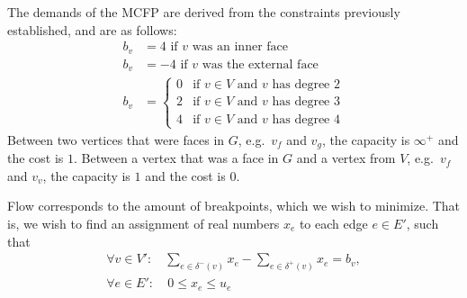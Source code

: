 The demands of the MCFP are derived from the constraints previously established,
and are as follows:
%
\begin{align*}
  b_v &= 4 \text{ if $v$ was an inner face} \\
  b_v &= -4 \text{ if $v$ was the external face} \\
  b_v &= \begin{cases}
        0 & \text{if $v \in V$ and $v$ has degree 2}\\
        2 & \text{if $v \in V$ and $v$  has degree 3}\\
        4 & \text{if $v \in V$ and $v$  has degree 4}
      \end{cases}
\end{align*}
%
Between two vertices that were faces in $G$, e.g.\ $v_f$ and $v_g$, the
capacity is $\infty^+$ and the cost is $1$. Between a vertex that was a face
in $G$ and a vertex from $V$, e.g.\ $v_f$ and $v_v$, the capacity is $1$ and
the cost is $0$.

Flow corresponds to the amount of breakpoints, which we wish to minimize. That
is, we wish to find an assignment of real numbers $x_e$ to each edge $e \in E'$,
such that
%
\begin{align*}
  \forall v\in V': & \sum_{e \in \delta^-(v)} x_e - \sum_{e \in \delta^+(v)} x_e = b_v,\\
  \forall e\in E': & \ 0 \leq x_e \leq u_e
\end{align*}


